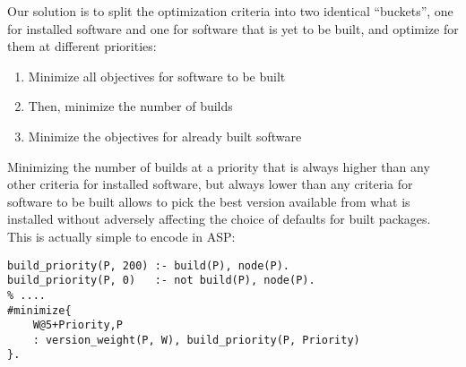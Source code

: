

Our solution is to split the optimization criteria into two identical ``buckets'', one
for installed software and one for software that is yet to be built, and optimize for
them at different priorities:
\begin{enumerate}
\item Minimize all objectives for software to be built
\item Then, minimize the number of builds
\item Minimize the objectives for already built software
\end{enumerate}
Minimizing the number of builds at a priority that is always higher than any other
criteria for installed software, but always lower than any criteria for software to be
built allows \spack{} to pick the best version available from what is installed without
adversely affecting the choice of defaults for built packages. This is actually simple
to encode in ASP:

\begin{verbatim}
build_priority(P, 200) :- build(P), node(P).
build_priority(P, 0)   :- not build(P), node(P).
% ....
#minimize{
    W@5+Priority,P
    : version_weight(P, W), build_priority(P, Priority)
}.
\end{verbatim}

